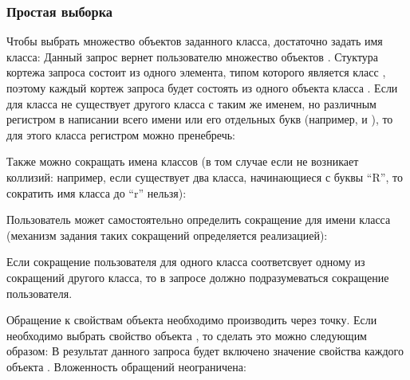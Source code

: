 \subsubsection{Простая выборка}\label{simple-select}
Чтобы выбрать множество объектов заданного класса, достаточно задать имя класса:
Данный запрос вернет пользователю множество объектов .
Стуктура кортежа запроса состоит из одного элемента, типом
которого является класс , поэтому каждый кортеж запроса
будет состоять из одного объекта класса .
Если для класса не существует другого класса с таким же именем, но различным регистром
в написании всего имени или его отдельных букв (например,  и ),
то для этого класса регистром можно пренебречь:

Также можно сокращать имена классов (в том случае если не возникает коллизий: 
например, если существует два класса, начинающиеся с буквы ``R'', то сократить
имя класса до ``r'' нельзя):

Пользователь может самостоятельно определить сокращение для имени класса (механизм
задания таких сокращений определяется реализацией):

Если сокращение пользователя для одного класса соответсвует одному из сокращений
другого класса, то в запросе должно подразумеваться сокращение пользователя.

Обращение к свойствам объекта необходимо производить через точку.  
Если необходимо выбрать свойство  объекта , 
то сделать это можно следующим образом:
В результат данного запроса будет включено значение свойства  каждого объекта .
Вложенность обращений неограничена:



